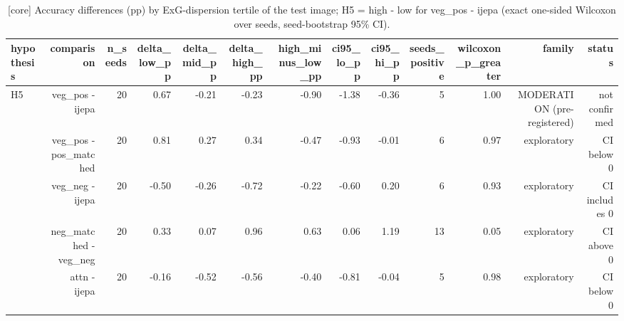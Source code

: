 \begin{table}[t]
\centering
\small
\caption{[core] Accuracy differences (pp) by ExG-dispersion tertile of the test image; H5 = high - low for veg\_pos - ijepa (exact one-sided Wilcoxon over seeds, seed-bootstrap 95\% CI).}
\label{tab:moderation}
\begin{tabular}{lrrrrrrrrrrrr}
\toprule
hypothesis & comparison & n\_seeds & delta\_low\_pp & delta\_mid\_pp & delta\_high\_pp & high\_minus\_low\_pp & ci95\_lo\_pp & ci95\_hi\_pp & seeds\_positive & wilcoxon\_p\_greater & family & status \\
\midrule
H5 & veg\_pos - ijepa & 20 & 0.67 & -0.21 & -0.23 & -0.90 & -1.38 & -0.36 & 5 & 1.00 & MODERATION (pre-registered) & not confirmed \\
 & veg\_pos - pos\_matched & 20 & 0.81 & 0.27 & 0.34 & -0.47 & -0.93 & -0.01 & 6 & 0.97 & exploratory & CI below 0 \\
 & veg\_neg - ijepa & 20 & -0.50 & -0.26 & -0.72 & -0.22 & -0.60 & 0.20 & 6 & 0.93 & exploratory & CI includes 0 \\
 & neg\_matched - veg\_neg & 20 & 0.33 & 0.07 & 0.96 & 0.63 & 0.06 & 1.19 & 13 & 0.05 & exploratory & CI above 0 \\
 & attn - ijepa & 20 & -0.16 & -0.52 & -0.56 & -0.40 & -0.81 & -0.04 & 5 & 0.98 & exploratory & CI below 0 \\
\bottomrule
\end{tabular}
\end{table}
